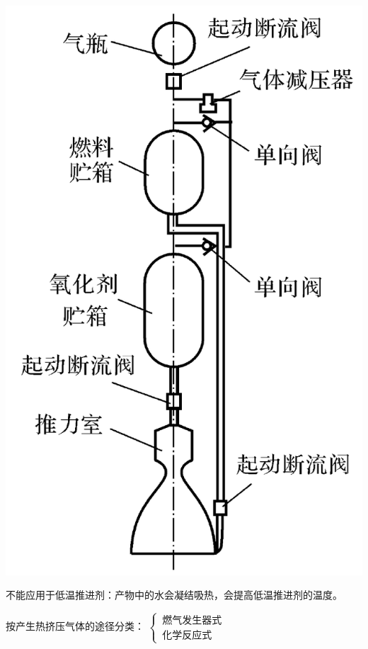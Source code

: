 \begin{minipage}{0.4\linewidth}
	\centering
	\vspace*{-4em}
	\includegraphics[width=0.8\linewidth]{pic/气瓶挤压.png}
	\vspace*{-1em}
\end{minipage}

\vspace*{1em}
\sssection[热气体挤压]

\blue[适用范围] \quad 不能应用于低温推进剂：产物中的水会凝结吸热，会提高低温推进剂的温度。
\vspace*{0.5em}

\blue[分类]\quad 按产生热挤压气体的途径分类：
$
\begin{cases}
	\, \mbox{燃气发生器式}\\
	\, \mbox{化学反应式}
\end{cases}
$


